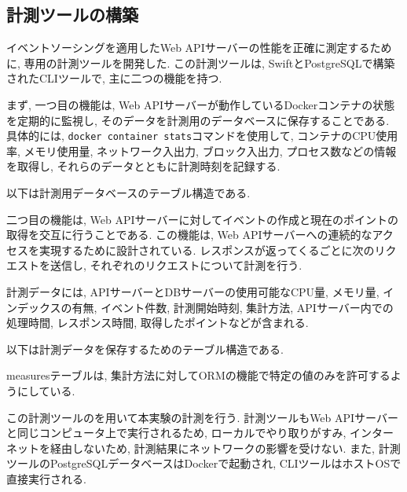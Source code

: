 \documentclass[../../../main]{subfiles}
\begin{document}
    \subsection{計測ツールの構築}\label{subsec:method-measurement_tool}

    イベントソーシングを適用したWeb APIサーバーの性能を正確に測定するために, 専用の計測ツールを開発した. この計測ツールは, SwiftとPostgreSQLで構築されたCLIツールで, 主に二つの機能を持つ.

    まず, 一つ目の機能は, Web APIサーバーが動作しているDockerコンテナの状態を定期的に監視し, そのデータを計測用のデータベースに保存することである. 具体的には, \texttt{docker container stats}コマンドを使用して, コンテナのCPU使用率, メモリ使用量, ネットワーク入出力, ブロック入出力, プロセス数などの情報を取得し, それらのデータとともに計測時刻を記録する.

    以下は計測用データベースのテーブル構造である.

    

    二つ目の機能は, Web APIサーバーに対してイベントの作成と現在のポイントの取得を交互に行うことである. この機能は, Web APIサーバーへの連続的なアクセスを実現するために設計されている. レスポンスが返ってくるごとに次のリクエストを送信し, それぞれのリクエストについて計測を行う.

    計測データには, APIサーバーとDBサーバーの使用可能なCPU量, メモリ量, インデックスの有無, イベント件数, 計測開始時刻, 集計方法, APIサーバー内での処理時間, レスポンス時間, 取得したポイントなどが含まれる.

    以下は計測データを保存するためのテーブル構造である.

    

    measuresテーブルは, 集計方法に対してORMの機能で特定の値のみを許可するようにしている.

    この計測ツールのを用いて本実験の計測を行う. 計測ツールもWeb APIサーバーと同じコンピュータ上で実行されるため, ローカルでやり取りがすみ, インターネットを経由しないため, 計測結果にネットワークの影響を受けない. また, 計測ツールのPostgreSQLデータベースはDockerで起動され, CLIツールはホストOSで直接実行される.
\end{document}

